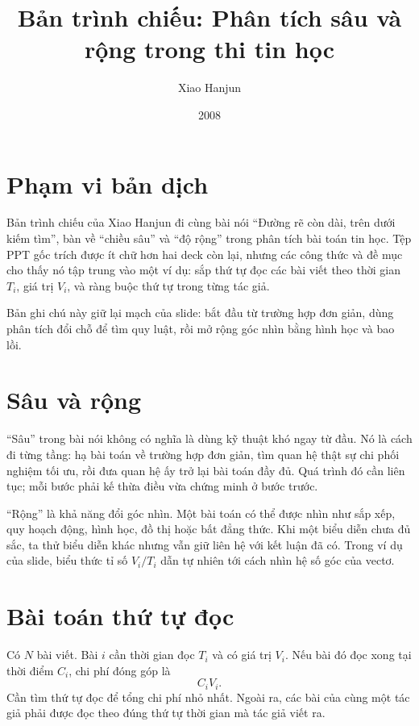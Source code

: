 \documentclass[11pt]{article}
\title{Bản trình chiếu: Phân tích sâu và rộng trong thi tin học}
\author{Xiao Hanjun}
\date{2008}
\begin{document}
\maketitle


\section{Phạm vi bản dịch}

Bản trình chiếu của Xiao Hanjun đi cùng bài nói ``Đường rẽ còn dài, trên dưới
kiếm tìm'', bàn về ``chiều sâu'' và ``độ rộng'' trong phân tích bài toán tin
học. Tệp PPT gốc trích được ít chữ hơn hai deck còn lại, nhưng các công thức
và đề mục cho thấy nó tập trung vào một ví dụ: sắp thứ tự đọc các bài viết
theo thời gian \(T_i\), giá trị \(V_i\), và ràng buộc thứ tự trong từng tác
giả.

Bản ghi chú này giữ lại mạch của slide: bắt đầu từ trường hợp đơn giản, dùng
phân tích đổi chỗ để tìm quy luật, rồi mở rộng góc nhìn bằng hình học và bao
lồi.

\section{Sâu và rộng}

``Sâu'' trong bài nói không có nghĩa là dùng kỹ thuật khó ngay từ đầu. Nó là
cách đi từng tầng: hạ bài toán về trường hợp đơn giản, tìm quan hệ thật sự
chi phối nghiệm tối ưu, rồi đưa quan hệ ấy trở lại bài toán đầy đủ. Quá trình
đó cần liên tục; mỗi bước phải kế thừa điều vừa chứng minh ở bước trước.

``Rộng'' là khả năng đổi góc nhìn. Một bài toán có thể được nhìn như sắp xếp,
quy hoạch động, hình học, đồ thị hoặc bất đẳng thức. Khi một biểu diễn chưa
đủ sắc, ta thử biểu diễn khác nhưng vẫn giữ liên hệ với kết luận đã có. Trong
ví dụ của slide, biểu thức tỉ số \(V_i/T_i\) dẫn tự nhiên tới cách nhìn hệ số
góc của vectơ.

\section{Bài toán thứ tự đọc}

Có \(N\) bài viết. Bài \(i\) cần thời gian đọc \(T_i\) và có giá trị \(V_i\).
Nếu bài đó đọc xong tại thời điểm \(C_i\), chi phí đóng góp là
\[
  C_iV_i.
\]
Cần tìm thứ tự đọc để tổng chi phí nhỏ nhất. Ngoài ra, các bài của cùng một
tác giả phải được đọc theo đúng thứ tự thời gian mà tác giả viết ra.
\end{document}
